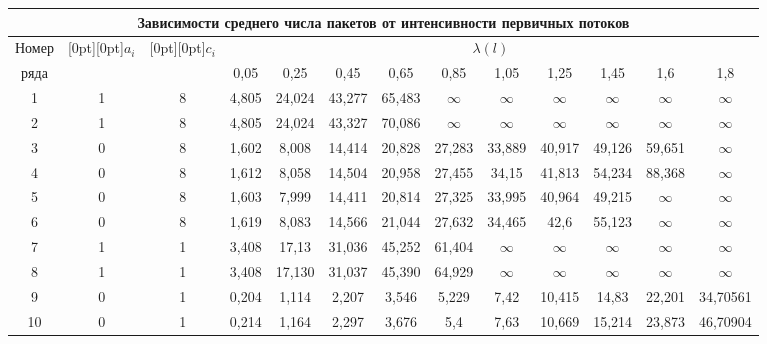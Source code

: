 \noindent
{\small
\begin{center}
\begin{tabular}{|c|c|c|c|c|c|c|c|c|c|c|c|c|}
\multicolumn{13}{c}{Зависимости среднего числа пакетов от интенсивности первичных потоков}\\[6pt]
\hline
Номер &\multicolumn{1}{c|}{\raisebox{-6pt}[0pt][0pt]{$a_i$}}&
\multicolumn{1}{c|}{\raisebox{-6pt}[0pt][0pt]{$c_i$}}&\multicolumn{10}{c|}{$\lambda(l)$}\\
\cline{4-13}
ряда&&&0,05&0,25&0,45&0,65&0,85&1,05&1,25&1,45&1,6&1,8\\
\hline
1&1&8&4,805&24,024&43,277&65,483&$\infty$&$\infty$&$\infty$&$\infty$&$\infty$&$\infty$\\
2&1&8&4,805&24,024&43,327&70,086&$\infty$&$\infty$&$\infty$&$\infty$&$\infty$&$\infty$\\
3&0&8&1,602&\hphantom{9}8,008&14,414&20,828&27,283&33,889&40,917&49,126&59,651&$\infty$\\
4&0&8&1,612&\hphantom{9}8,058&14,504&20,958&27,455&34,15&41,813&54,234&88,368&$\infty$\\
5&0&8&1,603&\hphantom{9}7,999&14,411&20,814&27,325&33,995&40,964&49,215&$\infty$&$\infty$\\
6&0&8&1,619&\hphantom{9}8,083&14,566&21,044&27,632&34,465&42,6\hphantom{99}&55,123&$\infty$&$\infty$\\
7&1&1&3,408&17,13\hphantom{9}&31,036&45,252&61,404&$\infty$&$\infty$&$\infty$&$\infty$&$\infty$\\
8&1&1&3,408&17,130&31,037&45,390&64,929&$\infty$&$\infty$&$\infty$&$\infty$&$\infty$\\
9&0&1&0,204&\hphantom{9}1,114&\hphantom{9}2,207&\hphantom{9}3,546&\hphantom{9}5,229&7,42&10,415&14,83\hphantom{9}&22,201&34,70561\\
10\hphantom{9}&0&1&0,214&\hphantom{9}1,164&\hphantom{9}2,297&\hphantom{9}3,676&5,4\hphantom{9}&7,63&10,669&15,214&23,873&46,70904\\
\hline
\end{tabular}
\end{center}

}     

\vspace*{12pt}

